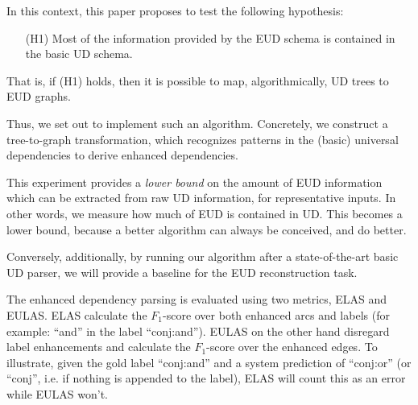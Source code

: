 \documentclass[11pt,a4paper]{article}
\begin{document}
In this context, this paper proposes to test the following hypothesis:
\begin{enumerate}
\item[(H1)] Most of the information provided by the EUD schema is
  contained in the basic UD schema.
\end{enumerate}

That is, if (H1) holds, then it is possible to map, algorithmically,
UD trees to EUD graphs.

Thus, we set out to implement such an algorithm. Concretely, we construct  a
tree-to-graph transformation, which recognizes patterns in the (basic)
universal dependencies to derive enhanced dependencies.
%


This experiment provides a \emph{lower bound} on the amount of EUD
information which can be extracted from raw UD information, for
representative inputs.  In other words, we measure how much of EUD is
contained in UD. This becomes a lower bound, because a better algorithm
can always be conceived, and do better.


Conversely, additionally, by running our algorithm after a
state-of-the-art basic UD parser, we will provide a baseline for the
EUD reconstruction task.
%
%

The enhanced dependency parsing is evaluated using two metrics,
ELAS and EULAS. ELAS calculate the $F_1$-score over both enhanced
arcs and labels (for example: ``and'' in the label
``conj:and''). EULAS on the other hand disregard label
enhancements and calculate the $F_1$-score over the enhanced
edges. To illustrate, given the gold label ``conj:and'' and a system
prediction of ``conj:or'' (or ``conj'', i.e. if nothing is
appended to the label), ELAS will count this as an error while
EULAS won't.

\end{document}
